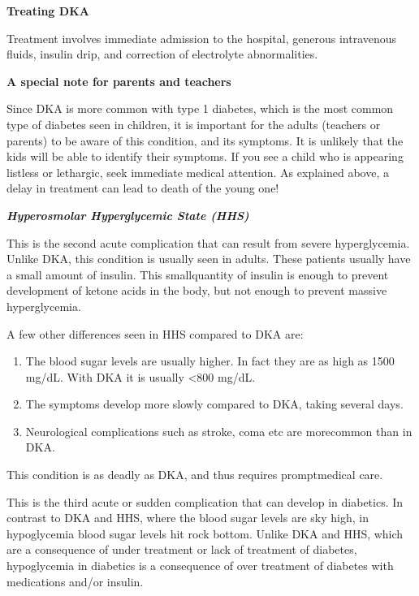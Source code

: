 \noindent\textbf{Treating DKA}

Treatment involves immediate admission to the hospital, gene\-rous intravenous fluids, insulin drip, and correction of electrolyte abnorma\-lities.

\noindent\textbf{A special note for parents and teachers}

Since DKA is more common with type 1 diabetes, which is the most common type of diabetes seen in children, it is important for the adults (teachers or parents) to be aware of this condition, and its symptoms. It is unlikely that the kids will be able to identify their symptoms. If you see a child who is appearing listless or lethargic, seek immediate medical attention. As explained above, a delay in treatment can lead to death of the young one!

\noindent\textbf{\textit{Hyperosmolar Hyperglycemic State (HHS)}}

This is the second acute complication that can result from severe hyperglycemia. Unlike DKA, this condition is usually seen in adults. These patients usually have a small amount of insulin. This small\break quantity of insulin is enough to prevent development of ketone acids in the body, but not enough to prevent massive hyperglycemia.

\noindent A few other differences seen in HHS compared to DKA are:

\begin{enumerate}[•]
\itemsep=0pt
\item The blood sugar levels are usually higher. In fact they are as high as 1500 mg/dL. With DKA it is usually \textless 800 mg/dL.
\item The symptoms develop more slowly compared to DKA, taking several days.
\item Neurological complications such as stroke, coma etc are more\break common than in DKA.
\end{enumerate}

This condition is as deadly as DKA, and thus requires prompt\break medical care.


This is the third acute or sudden complication that can develop in diabetics. In contrast to DKA and HHS, where the blood sugar levels are sky high, in hypoglycemia blood sugar levels hit rock bottom. Unlike DKA and HHS, which are a consequence of under treatment or lack of treatment of diabetes, hypoglycemia in diabetics is a consequence of over treatment of diabetes with medications and/or insulin.

